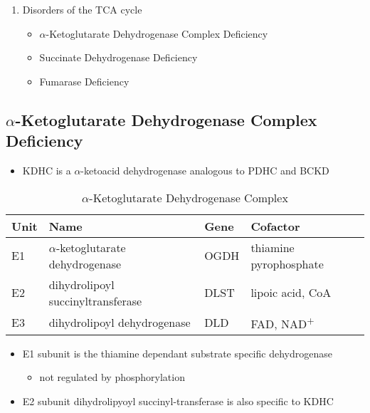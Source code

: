 \documentclass{scrartcl}
\begin{document}
\begin{enumerate}
\item Disorders of the TCA cycle
\label{sec:org982f70d}

\begin{itemize}
\item \(\alpha\)-Ketoglutarate Dehydrogenase Complex Deficiency
\item Succinate Dehydrogenase Deficiency
\item Fumarase Deficiency
\end{itemize}
\end{enumerate}

\subsection{\(\alpha\)-Ketoglutarate Dehydrogenase Complex Deficiency}
\label{sec:org8e59602}
\begin{itemize}
\item KDHC is a \(\alpha\)-ketoacid dehydrogenase analogous to PDHC and BCKD
\end{itemize}


\begin{table}[htbp]
\caption{\label{tab:orgfb3435c}\(\alpha\)-Ketoglutarate Dehydrogenase Complex}
\centering
\begin{tabular}{llll}
Unit & Name & Gene & Cofactor\\
\hline
E1 & \(\alpha\)-ketoglutarate dehydrogenase & OGDH & thiamine pyrophosphate\\
E2 & dihydrolipoyl succinyltransferase & DLST & lipoic acid, CoA\\
E3 & dihydrolipoyl dehydrogenase & DLD & FAD, NAD\textsuperscript{+}\\
\end{tabular}
\end{table}

\begin{itemize}
\item E1 subunit is the thiamine dependant substrate specific dehydrogenase
\begin{itemize}
\item not regulated by phosphorylation
\end{itemize}
\item E2 subunit dihydrolipyoyl succinyl-transferase is also specific to KDHC
\end{itemize}
\end{document}

